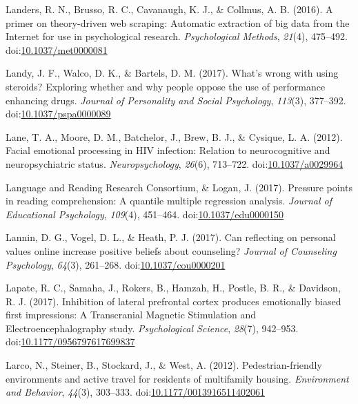 \documentclass[english,man]{apa6}
\theoremstyle{definition}
\theoremstyle{definition}
\theoremstyle{definition}
\theoremstyle{remark}
\begin{document}
\hypertarget{ref-Landers2016}{}
Landers, R. N., Brusso, R. C., Cavanaugh, K. J., \& Collmus, A. B.
(2016). A primer on theory-driven web scraping: Automatic extraction of
big data from the Internet for use in psychological research.
\emph{Psychological Methods}, \emph{21}(4), 475--492.
doi:\href{https://doi.org/10.1037/met0000081}{10.1037/met0000081}

\hypertarget{ref-Landy2017}{}
Landy, J. F., Walco, D. K., \& Bartels, D. M. (2017). What's wrong with
using steroids? Exploring whether and why people oppose the use of
performance enhancing drugs. \emph{Journal of Personality and Social
Psychology}, \emph{113}(3), 377--392.
doi:\href{https://doi.org/10.1037/pspa0000089}{10.1037/pspa0000089}

\hypertarget{ref-Lane2012}{}
Lane, T. A., Moore, D. M., Batchelor, J., Brew, B. J., \& Cysique, L. A.
(2012). Facial emotional processing in HIV infection: Relation to
neurocognitive and neuropsychiatric status. \emph{Neuropsychology},
\emph{26}(6), 713--722.
doi:\href{https://doi.org/10.1037/a0029964}{10.1037/a0029964}

\hypertarget{ref-LanguageandReadingResearchConsortium2017}{}
Language and Reading Research Consortium, \& Logan, J. (2017). Pressure
points in reading comprehension: A quantile multiple regression
analysis. \emph{Journal of Educational Psychology}, \emph{109}(4),
451--464.
doi:\href{https://doi.org/10.1037/edu0000150}{10.1037/edu0000150}

\hypertarget{ref-Lannin2017}{}
Lannin, D. G., Vogel, D. L., \& Heath, P. J. (2017). Can reflecting on
personal values online increase positive beliefs about counseling?
\emph{Journal of Counseling Psychology}, \emph{64}(3), 261--268.
doi:\href{https://doi.org/10.1037/cou0000201}{10.1037/cou0000201}

\hypertarget{ref-Lapate2017}{}
Lapate, R. C., Samaha, J., Rokers, B., Hamzah, H., Postle, B. R., \&
Davidson, R. J. (2017). Inhibition of lateral prefrontal cortex produces
emotionally biased first impressions: A Transcranial Magnetic
Stimulation and Electroencephalography study. \emph{Psychological
Science}, \emph{28}(7), 942--953.
doi:\href{https://doi.org/10.1177/0956797617699837}{10.1177/0956797617699837}

\hypertarget{ref-Larco2012}{}
Larco, N., Steiner, B., Stockard, J., \& West, A. (2012).
Pedestrian-friendly environments and active travel for residents of
multifamily housing. \emph{Environment and Behavior}, \emph{44}(3),
303--333.
doi:\href{https://doi.org/10.1177/0013916511402061}{10.1177/0013916511402061}
\end{document}
